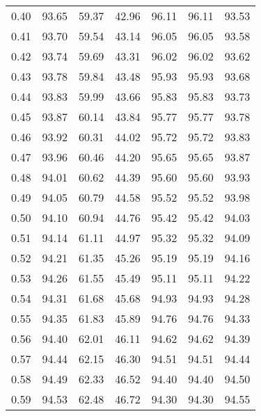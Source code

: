 \begin{tabular}{|c|c|c|c|c|c|c|}
      0.40 &     93.65 &     59.37 &      42.96 &   96.11 &      96.11 &         93.53 \\
      0.41 &     93.70 &     59.54 &      43.14 &   96.05 &      96.05 &         93.58 \\
      0.42 &     93.74 &     59.69 &      43.31 &   96.02 &      96.02 &         93.62 \\
      0.43 &     93.78 &     59.84 &      43.48 &   95.93 &      95.93 &         93.68 \\
      0.44 &     93.83 &     59.99 &      43.66 &   95.83 &      95.83 &         93.73 \\
      0.45 &     93.87 &     60.14 &      43.84 &   95.77 &      95.77 &         93.78 \\
      0.46 &     93.92 &     60.31 &      44.02 &   95.72 &      95.72 &         93.83 \\
      0.47 &     93.96 &     60.46 &      44.20 &   95.65 &      95.65 &         93.87 \\
      0.48 &     94.01 &     60.62 &      44.39 &   95.60 &      95.60 &         93.93 \\
      0.49 &     94.05 &     60.79 &      44.58 &   95.52 &      95.52 &         93.98 \\
      0.50 &     94.10 &     60.94 &      44.76 &   95.42 &      95.42 &         94.03 \\
      0.51 &     94.14 &     61.11 &      44.97 &   95.32 &      95.32 &         94.09 \\
      0.52 &     94.21 &     61.35 &      45.26 &   95.19 &      95.19 &         94.16 \\
      0.53 &     94.26 &     61.55 &      45.49 &   95.11 &      95.11 &         94.22 \\
      0.54 &     94.31 &     61.68 &      45.68 &   94.93 &      94.93 &         94.28 \\
      0.55 &     94.35 &     61.83 &      45.89 &   94.76 &      94.76 &         94.33 \\
      0.56 &     94.40 &     62.01 &      46.11 &   94.62 &      94.62 &         94.39 \\
      0.57 &     94.44 &     62.15 &      46.30 &   94.51 &      94.51 &         94.44 \\
      0.58 &     94.49 &     62.33 &      46.52 &   94.40 &      94.40 &         94.50 \\
      0.59 &     94.53 &     62.48 &      46.72 &   94.30 &      94.30 &         94.55 \\

\end{tabular}
